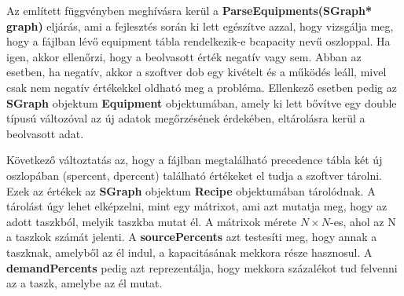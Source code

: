 Az említett függvényben meghívásra kerül a \textbf{ParseEquipments(SGraph* graph)} eljárás, ami a fejlesztés során ki lett egészítve azzal, hogy vizsgálja meg, hogy a fájlban lévő equipment tábla rendelkezik-e b\textunderscore capacity nevű oszloppal.
Ha igen, akkor ellenőrzi, hogy a beolvasott érték negatív vagy sem.
Abban az esetben, ha negatív, akkor a szoftver dob egy kivételt és a működés leáll, mivel csak nem negatív értékekkel oldható meg a probléma.
Ellenkező esetben pedig az \textbf{SGraph} objektum \textbf{Equipment} objektumában, amely ki lett bővítve egy double típusú változóval az új adatok megőrzésének érdekében, eltárolásra kerül a beolvasott adat.

Következő változtatás az, hogy a fájlban megtalálható precedence tábla két új oszlopában (s\textunderscore percent, d\textunderscore percent) található értékeket el tudja a szoftver tárolni.
Ezek az értékek az \textbf{SGraph} objektum \textbf{Recipe} objektumában tárolódnak.
A tárolást úgy lehet elképzelni, mint egy mátrixot, ami azt mutatja meg, hogy az adott taszkból, melyik taszkba mutat él.
A mátrixok mérete $N\times N$-es, ahol az N a taszkok számát jelenti.
A \textbf{sourcePercents} azt testesíti meg, hogy annak a taszknak, amelyből az él indul, a kapacitásának mekkora része hasznosul.
A \textbf{demandPercents} pedig azt reprezentálja, hogy mekkora százalékot tud felvenni az a taszk, amelybe az él mutat.

